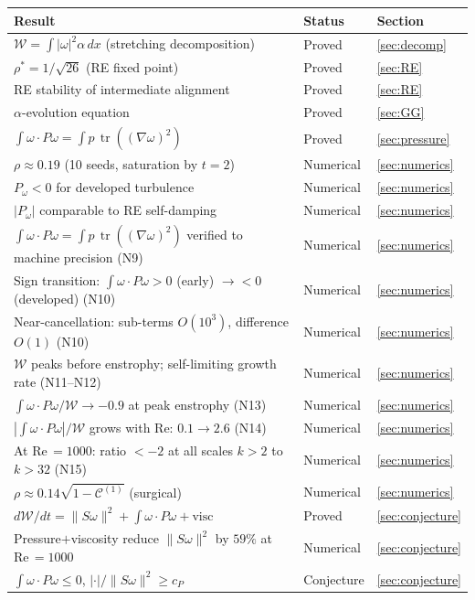 \documentclass[11pt,a4paper]{article}
\theoremstyle{plain}
\theoremstyle{definition}
\theoremstyle{remark}
\DeclareMathOperator{\tr}{tr}
\begin{document}
\begin{center}
\renewcommand{\arraystretch}{1.2}
\begin{tabular}{@{}lll@{}}
\toprule
\textbf{Result} & \textbf{Status} & \textbf{Section} \\
\midrule
$\mathcal{W}=\int|\omega|^2\alpha\,dx$
  (stretching decomposition)
  & Proved & \ref{sec:decomp} \\
$\rho^*=1/\sqrt{26}$ (RE fixed point)
  & Proved & \ref{sec:RE} \\
RE stability of intermediate alignment
  & Proved & \ref{sec:RE} \\
$\alpha$-evolution equation
  & Proved & \ref{sec:GG} \\
$\int\omega\cdot P\omega = \int p\,\tr((\nabla\omega)^2)$
  & Proved & \ref{sec:pressure} \\
$\rho\approx 0.19$ (10 seeds, saturation by $t=2$)
  & Numerical & \ref{sec:numerics} \\
$P_\omega<0$ for developed turbulence
  & Numerical & \ref{sec:numerics} \\
$|P_\omega|$ comparable to RE self-damping
  & Numerical & \ref{sec:numerics} \\
$\int\omega\cdot P\omega = \int p\,\tr((\nabla\omega)^2)$
  verified to machine precision (N9)
  & Numerical & \ref{sec:numerics} \\
Sign transition: $\int\omega\cdot P\omega>0$ (early)
  $\to<0$ (developed) (N10)
  & Numerical & \ref{sec:numerics} \\
Near-cancellation: sub-terms $O(10^3)$,
  difference $O(1)$ (N10)
  & Numerical & \ref{sec:numerics} \\
$\mathcal{W}$ peaks before enstrophy;
  self-limiting growth rate (N11--N12)
  & Numerical & \ref{sec:numerics} \\
$\int\omega\cdot P\omega/\mathcal{W}\to -0.9$
  at peak enstrophy (N13)
  & Numerical & \ref{sec:numerics} \\
$|\!\int\omega\cdot P\omega|/\mathcal{W}$
  grows with Re: $0.1\to 2.6$ (N14)
  & Numerical & \ref{sec:numerics} \\
At Re$\,=1000$: ratio $<-2$ at all scales
  $k>2$ to $k>32$ (N15)
  & Numerical & \ref{sec:numerics} \\
$\rho\approx 0.14\sqrt{1-\mathcal{C}^{(1)}}$
  (surgical)
  & Numerical & \ref{sec:numerics} \\
$d\mathcal{W}/dt = \|S\omega\|^2
  +\int\omega\cdot P\omega+\text{visc}$
  & Proved & \ref{sec:conjecture} \\
Pressure$+$viscosity reduce $\|S\omega\|^2$
  by $59\%$ at Re$\,=1000$
  & Numerical & \ref{sec:conjecture} \\
$\int\omega\cdot P\omega\leq 0$,
  $|\cdot|/\|S\omega\|^2\geq c_P$
  & Conjecture & \ref{sec:conjecture} \\
\bottomrule
\end{tabular}
\end{center}
\end{document}
